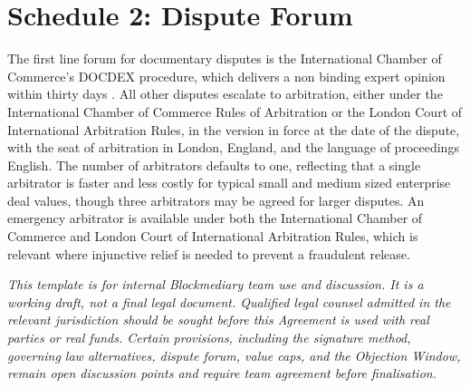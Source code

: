 \documentclass[12pt, a4paper]{article}
\begin{document}
\section*{Schedule 2: Dispute Forum}

The first line forum for documentary disputes is the International Chamber of Commerce's
DOCDEX procedure, which delivers a non binding expert opinion within thirty days
\citep{iccdocdex}. All other disputes escalate to arbitration, either under the
International Chamber of Commerce Rules of Arbitration or the London Court of
International Arbitration Rules, in the version in force at the date of the dispute, with
the seat of arbitration in London, England, and the language of proceedings English. The
number of arbitrators defaults to one, reflecting that a single arbitrator is faster and
less costly for typical small and medium sized enterprise deal values, though three
arbitrators may be agreed for larger disputes. An emergency arbitrator is available under
both the International Chamber of Commerce and London Court of International Arbitration
Rules, which is relevant where injunctive relief is needed to prevent a fraudulent
release.

\vspace{1cm}
\noindent\textit{This template is for internal Blockmediary team use and discussion. It is
a working draft, not a final legal document. Qualified legal counsel admitted in the
relevant jurisdiction should be sought before this Agreement is used with real parties or
real funds. Certain provisions, including the signature method, governing law
alternatives, dispute forum, value caps, and the Objection Window, remain open discussion
points and require team agreement before finalisation.}

\newpage


\end{document}

